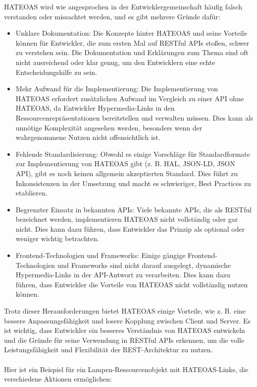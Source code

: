 \documentclass[../vs-script-first-v01.tex]{subfiles}
\begin{document}
HATEOAS wird wie angesprochen in der Entwicklergemeinschaft häufig falsch verstanden oder missachtet werden, und es gibt mehrere Gründe dafür:
\begin{itemize}
\item Unklare Dokumentation: Die Konzepte hinter HATEOAS und seine Vorteile können für Entwickler, die zum ersten Mal auf RESTful APIs stoßen, schwer zu verstehen sein. Die Dokumentation und Erklärungen zum Thema sind oft nicht ausreichend oder klar genug, um den Entwicklern eine echte Entscheidungshilfe zu sein.
\item  Mehr Aufwand für die Implementierung: Die Implementierung von HATEOAS erfordert zusätzlichen Aufwand im Vergleich zu einer API ohne HATEOAS, da Entwickler Hypermedia-Links in den Ressourcenrepräsentationen bereitstellen und verwalten müssen. Dies kann als unnötige Komplexität angesehen werden, besonders wenn der wahrgenommene Nutzen nicht offensichtlich ist.
\item  Fehlende Standardisierung: Obwohl es einige Vorschläge für Standardformate zur Implementierung von HATEOAS gibt (z. B. HAL, JSON-LD, JSON API), gibt es noch keinen allgemein akzeptierten Standard. Dies führt zu Inkonsistenzen in der Umsetzung und macht es schwieriger, Best Practices zu etablieren.
\item  Begrenzter Einsatz in bekannten APIs: Viele bekannte APIs, die als RESTful bezeichnet werden, implementieren HATEOAS nicht vollständig oder gar nicht. Dies kann dazu führen, dass Entwickler das Prinzip als optional oder weniger wichtig betrachten.
\item  Frontend-Technologien und Frameworks: Einige gängige Frontend-Technologien und Frameworks sind nicht darauf ausgelegt, dynamische Hypermedia-Links in der API-Antwort zu verarbeiten. Dies kann dazu führen, dass Entwickler die Vorteile von HATEOAS nicht vollständig nutzen können.
\end{itemize}
Trotz dieser Herausforderungen bietet HATEOAS einige Vorteile, wie z. B. eine bessere Anpassungsfähigkeit und losere Kopplung zwischen Client und Server. Es ist wichtig, dass Entwickler ein besseres Verständnis von HATEOAS entwickeln und die Gründe für seine Verwendung in RESTful APIs erkennen, um die volle Leistungsfähigkeit und Flexibilität der REST-Architektur zu nutzen.
\\\\
Hier ist ein Beispiel für ein Lampen-Ressourcenobjekt mit HATEOAS-Links, die verschiedene Aktionen ermöglichen:\\\\
\end{document}
